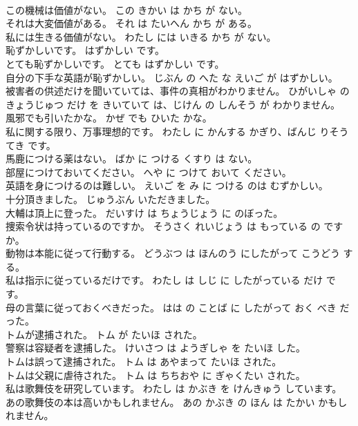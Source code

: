 \documentclass[8pt]{extreport}
\begin{document}
\begin{CJK}{UTF8}{min}
\\	この機械は価値がない。	この きかい は かち が ない。	
\\	それは大変価値がある。	それ は たいへん かち が ある。	
\\	私には生きる価値がない。	わたし には いきる かち が ない。	
\\	恥ずかしいです。	はずかしい です。	
\\	とても恥ずかしいです。	とても はずかしい です。	
\\	自分の下手な英語が恥ずかしい。	じぶん の へた な えいご が はずかしい。	
\\	被害者の供述だけを聞いていては、事件の真相がわかりません。	ひがいしゃ の きょうじゅつ だけ を きいていて は、じけん の しんそう が わかりません。	
\\	風邪でも引いたかな。	かぜ でも ひいた かな。	
\\	私に関する限り、万事理想的です。	わたし に かんする かぎり、ばんじ りそうてき です。	
\\	馬鹿につける薬はない。	ばか に つける くすり は ない。	
\\	部屋につけておいてください。	へや に つけて おいて ください。	
\\	英語を身につけるのは難しい。	えいご を み に つける のは むずかしい。	
\\	十分頂きました。	じゅうぶん いただきました。	
\\	大輔は頂上に登った。	だいすけ は ちょうじょう に のぼった。	
\\	捜索令状は持っているのですか。	そうさく れいじょう は もっている の です か。	
\\	動物は本能に従って行動する。	どうぶつ は ほんのう にしたがって こうどう する。	
\\	私は指示に従っているだけです。	わたし は しじ に したがっている だけ です。	
\\	母の言葉に従っておくべきだった。	はは の ことば に したがって おく べき だった。	
\\	トムが逮捕された。	トム が たいほ された。	
\\	警察は容疑者を逮捕した。	けいさつ は ようぎしゃ を たいほ した。	
\\	トムは誤って逮捕された。	トム は あやまって たいほ された。	
\\	トムは父親に虐待された。	トム は ちちおや に ぎゃくたい された。	
\\	私は歌舞伎を研究しています。	わたし は かぶき を けんきゅう しています。	
\\	あの歌舞伎の本は高いかもしれません。	あの かぶき の ほん は たかい かもしれません。	

\end{CJK}
\end{document}

